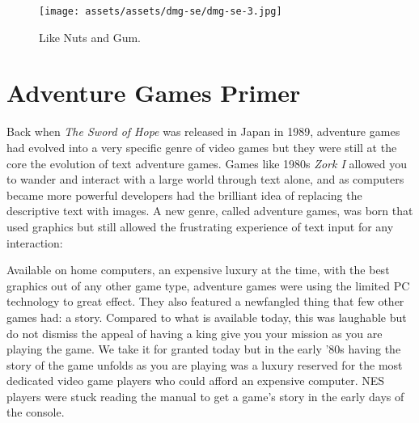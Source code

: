 \documentclass{book}
\begin{document}
\begin{figure}[hbt]
\vskip 10pt
\centering \texttt{[image: assets/assets/dmg-se/dmg-se-3.jpg]}\par\pagetwodescription Like Nuts and Gum.
\vskip 6pt
\end{figure}

\FloatBarrier\needspace{5pt}\section*{Adventure Games Primer}\nopagebreak[4]

Back when \emph{The Sword of Hope} was released in Japan in 1989, adventure games had evolved into a very specific genre of video games but they were still at the core the evolution of text adventure games. Games like 1980s \emph{Zork I} allowed you to wander and interact with a large world through text alone, and as computers became more powerful developers had the brilliant idea of replacing the descriptive text with images. A new genre, called adventure games, was born that used graphics but still allowed the frustrating experience of text input for any interaction:


Available on home computers, an expensive luxury at the time, with the best graphics out of any other game type, adventure games were using the limited PC technology to great effect. They also featured a newfangled thing that few other games had: a story. Compared to what is available today, this was laughable but do not dismiss the appeal of having a king give you your mission as you are playing the game. We take it for granted today but in the early ’80s having the story of the game unfolds as you are playing was a luxury reserved for the most dedicated video game players who could afford an expensive computer. NES players were stuck reading the manual to get a game’s story in the early days of the console.
\end{document}
